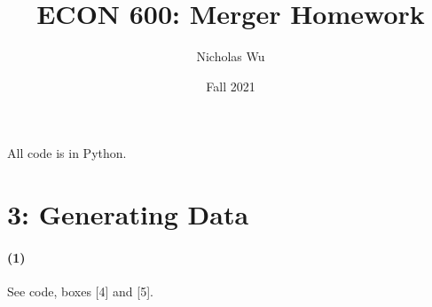 \documentclass[10pt,letter]{article}
\begin{document}


\title{ECON 600: Merger Homework}

\author{Nicholas Wu}

\date{Fall 2021}

\maketitle

All code is in Python.

\section*{3: Generating Data}
\paragraph{(1)} See code, boxes [4] and [5].
\end{document}
